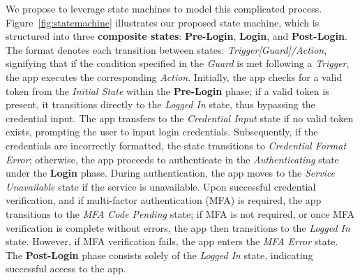 We propose to leverage state machines to model this complicated process.
Figure~\ref{fig:statemachine} illustrates our proposed state machine, which is structured into three \textbf{composite states}: \textbf{Pre-Login}, \textbf{Login}, and \textbf{Post-Login}. The format denotes each transition between states: \textit{Trigger[Guard]/Action}, signifying that if the condition specified in the \textit{Guard} is met following a \textit{Trigger}, the app executes the corresponding \textit{Action}. Initially, the app checks for a valid token from the \textit{Initial State} within the \textbf{Pre-Login} phase; if a valid token is present, it transitions directly to the \textit{Logged In} state, thus bypassing the credential input. The app transfers to the \textit{Credential Input} state if no valid token exists, prompting the user to input login credentials. Subsequently, if the credentials are incorrectly formatted, the state transitions to \textit{Credential Format Error}; otherwise, the app proceeds to authenticate in the \textit{Authenticating} state under the \textbf{Login} phase. During authentication, the app moves to the \textit{Service Unavailable} state if the service is unavailable. Upon successful credential verification, and if multi-factor authentication (MFA) is required, the app transitions to the \textit{MFA Code Pending} state; if MFA is not required, or once MFA verification is complete without errors, the app then transitions to the \textit{Logged In} state. However, if MFA verification fails, the app enters the \textit{MFA Error} state. The \textbf{Post-Login} phase consists solely of the \textit{Logged In} state, indicating successful access to the app.

